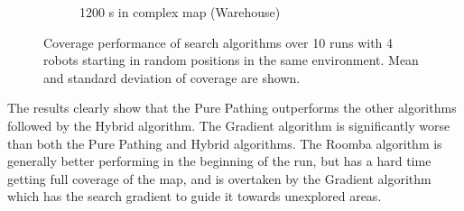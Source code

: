 \begin{figure}[H]
\begin{subfigure}[b]{0.49\textwidth}
      \caption{1200 s in complex map (Warehouse)}
  \end{subfigure}
    \caption{Coverage performance of search algorithms over 10 runs with 4 robots starting in random positions in the same environment. Mean and standard deviation of coverage are shown.}
    \label{fig:coverage-benchmark}
\end{figure}

The results clearly show that the Pure Pathing outperforms the other algorithms followed by the Hybrid algorithm. The Gradient algorithm is significantly worse than both the Pure Pathing and Hybrid algorithms. The Roomba algorithm is generally better performing in the beginning of the run, but has a hard time getting full coverage of the map, and is overtaken by the Gradient algorithm which has the search gradient to guide it towards unexplored areas.

